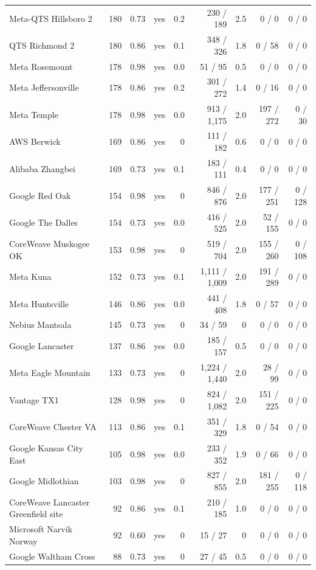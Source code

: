 {\begin{longtable}{@{}lrrlrrrrr@{}}
Meta-QTS Hillsboro 2 & 180 & 0.73 & yes & 0.2 & 230 / 189 & 2.5 & 0 / 0 & 0 / 0 \\
QTS Richmond 2 & 180 & 0.86 & yes & 0.1 & 348 / 326 & 1.8 & 0 / 58 & 0 / 0 \\
Meta Rosemount & 178 & 0.98 & yes & 0.0 & 51 / 95 & 0.5 & 0 / 0 & 0 / 0 \\
Meta Jeffersonville & 178 & 0.86 & yes & 0.2 & 301 / 272 & 1.4 & 0 / 16 & 0 / 0 \\
Meta Temple & 178 & 0.98 & yes & 0.0 & 913 / 1,175 & 2.0 & 197 / 272 & 0 / 30 \\
AWS Berwick & 169 & 0.86 & yes & 0 & 111 / 182 & 0.6 & 0 / 0 & 0 / 0 \\
Alibaba Zhangbei & 169 & 0.73 & yes & 0.1 & 183 / 111 & 0.4 & 0 / 0 & 0 / 0 \\
Google Red Oak & 154 & 0.98 & yes & 0 & 846 / 876 & 2.0 & 177 / 251 & 0 / 128 \\
Google The Dalles & 154 & 0.73 & yes & 0.0 & 416 / 525 & 2.0 & 52 / 155 & 0 / 0 \\
CoreWeave Muskogee OK & 153 & 0.98 & yes & 0 & 519 / 704 & 2.0 & 155 / 260 & 0 / 108 \\
Meta Kuna & 152 & 0.73 & yes & 0.1 & 1,111 / 1,009 & 2.0 & 191 / 289 & 0 / 0 \\
Meta Huntsville & 146 & 0.86 & yes & 0.0 & 441 / 408 & 1.8 & 0 / 57 & 0 / 0 \\
Nebius Mantsala & 145 & 0.73 & yes & 0 & 34 / 59 & 0 & 0 / 0 & 0 / 0 \\
Google Lancaster & 137 & 0.86 & yes & 0.0 & 185 / 157 & 0.5 & 0 / 0 & 0 / 0 \\
Meta Eagle Mountain & 133 & 0.73 & yes & 0 & 1,224 / 1,440 & 2.0 & 28 / 99 & 0 / 0 \\
Vantage TX1 & 128 & 0.98 & yes & 0 & 824 / 1,082 & 2.0 & 151 / 225 & 0 / 0 \\
CoreWeave Chester VA & 113 & 0.86 & yes & 0.1 & 351 / 329 & 1.8 & 0 / 54 & 0 / 0 \\
Google Kansas City East & 105 & 0.98 & yes & 0.0 & 233 / 352 & 1.9 & 0 / 66 & 0 / 0 \\
Google Midlothian & 103 & 0.98 & yes & 0 & 827 / 855 & 2.0 & 181 / 255 & 0 / 118 \\
CoreWeave Lancaster Greenfield site & 92 & 0.86 & yes & 0.1 & 210 / 185 & 1.0 & 0 / 0 & 0 / 0 \\
Microsoft Narvik Norway & 92 & 0.60 & yes & 0 & 15 / 27 & 0 & 0 / 0 & 0 / 0 \\
Google Waltham Cross & 88 & 0.73 & yes & 0 & 27 / 45 & 0.5 & 0 / 0 & 0 / 0 \\

\end{longtable}}
